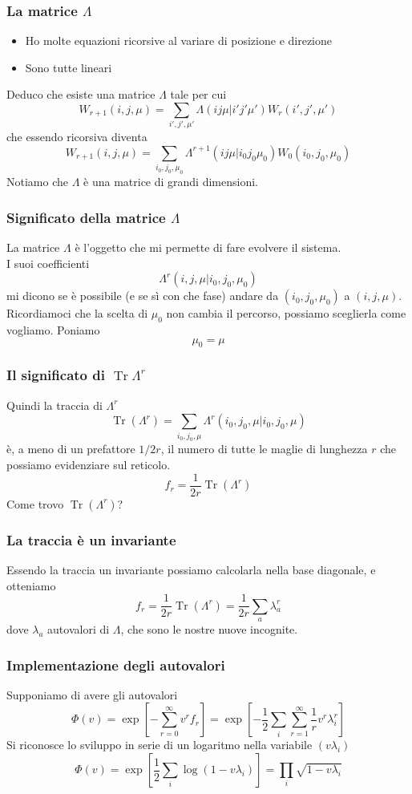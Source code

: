 \documentclass[11pt]{beamer}
\DeclareMathOperator{\Tr}{Tr}
\DeclareMathOperator{\Exp}{exp}
\DeclareMathOperator{\Log}{log}
\begin{document}
\begin{frame}
\frametitle{La matrice $\Lambda$}
\begin{itemize}
\item{Ho molte equazioni ricorsive al variare di posizione e direzione}
\item{Sono tutte lineari}
\end{itemize}
Deduco che esiste una matrice $\Lambda$ tale per cui
$$
W_{r+1}(i,j,\mu)=\sum_{i',j',\mu'}\Lambda(ij\mu|i'j'\mu')W_{r}(i',j',\mu')
$$
che essendo ricorsiva diventa
$$
W_{r+1}(i,j,\mu)=\sum_{i_0,j_0,\mu_0}\Lambda^{r+1}(ij\mu|i_0j_0\mu_0)W_{0}(i_0,j_0,\mu_0)
$$
Notiamo che $\Lambda$ è una matrice di grandi dimensioni.
\end{frame}

\begin{frame}
\frametitle{Significato della matrice $\Lambda$}
La matrice $\Lambda$ è l'oggetto che mi permette di fare evolvere il sistema.\\
I suoi coefficienti
$$\Lambda^r(i,j,\mu|i_0,j_0,\mu_0)$$
mi dicono se è possibile (e se sì con che fase) andare da $(i_0,j_0,\mu_0)$ a $(i,j,\mu)$.\\

Ricordiamoci che la scelta di $\mu_0$ non cambia il percorso, possiamo sceglierla come vogliamo. Poniamo
$$
\mu_0=\mu
$$
\end{frame}

\begin{frame} 
\frametitle{Il significato di $\Tr\Lambda^r$}
Quindi la traccia di $\Lambda^r$
$$ \Tr{(\Lambda^r)}=\sum_{i_0,j_0,\mu} \Lambda^r(i_0,j_0,\mu|i_0,j_0,\mu)
$$
è, a meno di un prefattore $1/2r$, il numero di tutte le maglie di lunghezza $r$ che possiamo evidenziare sul reticolo.\\

$$f_r=\frac{1}{2r}\Tr{(\Lambda^r)}
$$
Come trovo $\Tr{(\Lambda^r)}$?
\end{frame}

\begin{frame}
\frametitle{La traccia è un invariante}
Essendo la traccia un invariante possiamo calcolarla nella base diagonale, e otteniamo
$$
f_r=\frac{1}{2r}\Tr{(\Lambda^r)}=\frac{1}{2r}\sum_a \lambda_a^r
$$
dove $\lambda_a$ autovalori di $\Lambda$, che sono le nostre nuove incognite.\\

\end{frame}

\begin{frame}
\frametitle{Implementazione degli autovalori}
Supponiamo di avere gli autovalori
$$ \Phi(v)= \exp \left[ - \sum_{r=0}^\infty v^r f_r \right] = \Exp \left [ -\frac{1}{2}\sum_i\sum_{r=1}^\infty\frac{1}{r}v^r\lambda_i^r \right ]$$
Si riconosce lo sviluppo in serie di un logaritmo nella variabile $(v\lambda_i)$
$$
\Phi(v) = \Exp \left [ \frac{1}{2} \sum_i \Log (1-v\lambda_i) \right]= \prod_i \sqrt{1-v\lambda_i}
$$
\end{frame}
\end{document}
